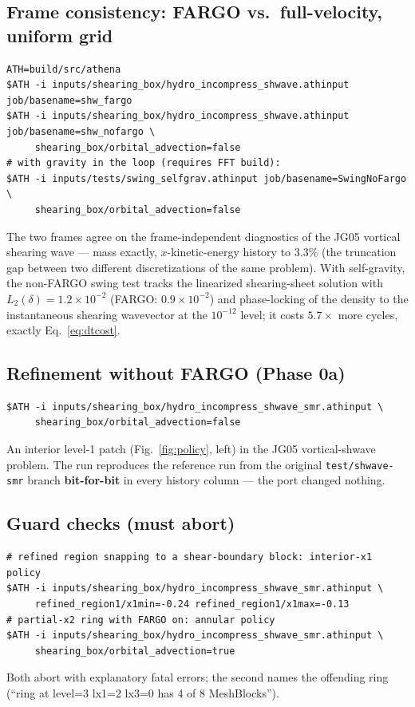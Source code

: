\documentclass[11pt]{article}
\newcommand{\code}[1]{\texttt{#1}}
\begin{document}
\subsection{Frame consistency: FARGO vs.\ full-velocity, uniform grid}
\label{sec:t_nofargo}
\begin{lstlisting}
ATH=build/src/athena
$ATH -i inputs/shearing_box/hydro_incompress_shwave.athinput job/basename=shw_fargo
$ATH -i inputs/shearing_box/hydro_incompress_shwave.athinput job/basename=shw_nofargo \
     shearing_box/orbital_advection=false
# with gravity in the loop (requires FFT build):
$ATH -i inputs/tests/swing_selfgrav.athinput job/basename=SwingNoFargo \
     shearing_box/orbital_advection=false
\end{lstlisting}
The two frames agree on the frame-independent diagnostics of the JG05 vortical
shearing wave --- mass exactly, $x$-kinetic-energy history to 3.3\% (the truncation
gap between two different discretizations of the same problem). With self-gravity,
the non-FARGO swing test tracks the linearized shearing-sheet solution with
$L_2(\delta) = 1.2\times10^{-2}$ (FARGO: $0.9\times10^{-2}$) and phase-locking of the
density to the instantaneous shearing wavevector at the $10^{-12}$ level; it costs
$5.7\times$ more cycles, exactly Eq.~\eqref{eq:dtcost}.

\subsection{Refinement without FARGO (Phase 0a)}
\begin{lstlisting}
$ATH -i inputs/shearing_box/hydro_incompress_shwave_smr.athinput \
     shearing_box/orbital_advection=false
\end{lstlisting}
An interior level-1 patch (Fig.~\ref{fig:policy}, left) in the JG05 vortical-shwave
problem. The run reproduces the reference run from the original \code{test/shwave-smr}
branch \textbf{bit-for-bit} in every history column --- the port changed nothing.

\subsection{Guard checks (must abort)}
\begin{lstlisting}
# refined region snapping to a shear-boundary block: interior-x1 policy
$ATH -i inputs/shearing_box/hydro_incompress_shwave_smr.athinput \
     refined_region1/x1min=-0.24 refined_region1/x1max=-0.13
# partial-x2 ring with FARGO on: annular policy
$ATH -i inputs/shearing_box/hydro_incompress_shwave_smr.athinput \
     shearing_box/orbital_advection=true
\end{lstlisting}
Both abort with explanatory fatal errors; the second names the offending ring
(``ring at level=3 lx1=2 lx3=0 has 4 of 8 MeshBlocks'').
\end{document}
